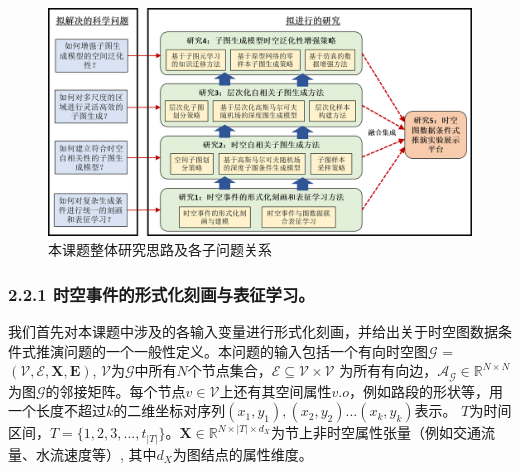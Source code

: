 \documentclass[12pt,UTF8,AutoFakeBold=2,a4paper]{ctexart} %
\begin{document}
\begin{figure}
    \centering
    \includegraphics[width=1\linewidth]{fig/overall.png}
    \caption{本课题整体研究思路及各子问题关系}
    \label{fig:overall}
\end{figure}

\subsubsection{2.2.1 时空事件的形式化刻画与表征学习。}

我们首先对本课题中涉及的各输入变量进行形式化刻画，并给出关于时空图数据条件式推演问题的一个一般性定义。本问题的输入包括一个有向时空图$\mathcal{G}$ = $(\mathcal{V}, \mathcal{E}, \mathbf{X}, \mathbf{E})$, $\mathcal{V}$为$\mathcal{G}$中所有$N$个节点集合，$\mathcal{E} \subseteq \mathcal{V}\times \mathcal{V}$ 为所有有向边，$\mathcal{A_G}\in \mathbb{R}^{N\times N}$为图$\mathcal{G}$的邻接矩阵。每个节点$v\in \mathcal{V}$上还有其空间属性$v.o$，例如路段的形状等，用一个长度不超过$k$的二维坐标对序列$(x_1, y_1),(x_2, y_2)...(x_k, y_k)$表示。
$T$为时间区间，$T = \{1,2,3,...,t_{|T|}\}$。$\mathbf{X} \in \mathbb{R}^{N\times|T|\times d_X}$为节上非时空属性张量（例如交通流量、水流速度等）, 其中$d_X$为图结点的属性维度。

\end{document}
